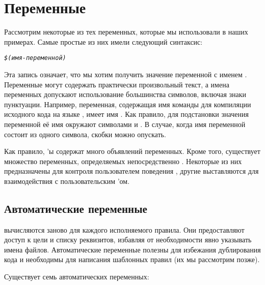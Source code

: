 \section{Переменные}

Рассмотрим некоторые из тех переменных, которые мы использовали в
наших примерах. Самые простые из них имели следующий синтаксис:

{\footnotesize
\begin{alltt}
\emph{\$(имя-переменной)}
\end{alltt}
}

Эта запись означает, что мы хотим получить значение переменной с
именем . Переменные могут содержать
практически произвольный текст, а имена переменных допускают
использование большинства символов, включая знаки пунктуации.
Например, переменная, содержащая имя команды для компиляции исходного
кода на языке \Clang{}, имеет имя . Как правило,
для подстановки значения переменной её имя окружают символами
\command{\$(} и \command{)}. В случае, когда имя переменной состоит из
одного символа, скобки можно опускать.

Как правило, \Makefile{}'ы содержат много объявлений переменных. Кроме
того, существует множество переменных, определяемых непосредственно
\GNUmake{}. Некоторые из них предназначены для контроля пользователем
поведения \GNUmake{}, другие выставляются \GNUmake{} для
взаимодействия с пользовательским \Makefile{}'ом.

\subsection*{Автоматические переменные}
\label{sec:automatic_vars}

 вычисляются \GNUmake{} заново для
каждого исполняемого правила. Они предоставляют доступ к цели и списку
реквизитов, избавляя от необходимости явно указывать имена файлов.
Автоматические переменные полезны для избежания дублирования кода и
необходимы для написания шаблонных правил (их мы рассмотрим позже).

Существует семь автоматических переменных:

